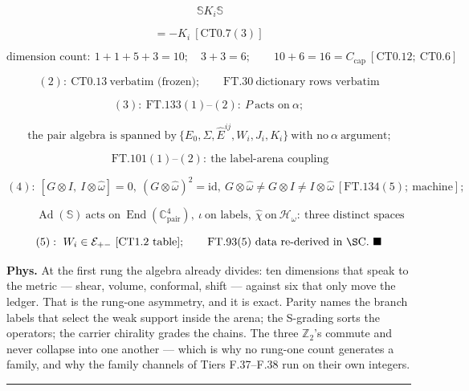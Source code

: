 \begin{theorem}
\[
\ \mathbb SK_i\mathbb S
\]

\[
= -K_i\ [\mathrm{CT0.7}(3)]
\]

\[
\text{dimension count}:\ 1+1+5+3=10;\quad3+3=6;\qquad10+6=16=C_{\mathrm{cap}}\ [\mathrm{CT0.12};\ \mathrm{CT0.6}]
\]

\[
(2):\ \mathrm{CT0.13}\ \text{verbatim (frozen)};\qquad\mathrm{FT.30}\ \text{dictionary rows verbatim}
\]

\[
(3):\ \mathrm{FT.133}(1)\text{–}(2):\ P\ \text{acts on}\ \alpha;
\]

\[
\ \text{the pair algebra is spanned by}\ \{E_0,\Sigma,\hat E^{ij},W_i,J_i,K_i\}\ \text{with no}\ \alpha\ \text{argument};
\]

\[
\qquad \mathrm{FT.101}(1)\text{–}(2):\ \text{the label-arena coupling}
\]

\[
(4):\ [G\otimes I,\ I\otimes\hat\omega]=0,\ (G\otimes\hat\omega)^2=\mathrm{id},\ G\otimes\hat\omega\ne G\otimes I\ne I\otimes\hat\omega\ [\mathrm{FT.134}(5);\ \text{machine}];
\]

\[
\qquad \operatorname{Ad}(\mathbb S)\ \text{acts on}\ \operatorname{End}(\mathbb C^4_{\mathrm{pair}}),\ \iota\ \text{on labels},\ \hat\chi\ \text{on}\ \mathcal H_\omega:\ \text{three distinct spaces}
\]

\[
(5):\ W_i\in\mathcal E_{+-}\ [\mathrm{CT1.2}\ \text{table}];\qquad\mathrm{FT.93}(5)\ \text{data re-derived in}\ \S\mathrm{C}.\ \blacksquare
\]

\textbf{Phys.} At the first rung the algebra already divides: ten dimensions that speak to the metric — shear, volume, conformal, shift — against six that only move the ledger. That is the rung-one asymmetry, and it is exact. Parity names the branch labels that select the weak support inside the arena; the S-grading sorts the operators; the carrier chirality grades the chains. The three $\mathbb{Z}$$_2$'s commute and never collapse into one another — which is why no rung-one count generates a family, and why the family channels of Tiers F.37–F.38 run on their own integers.

\vspace{2pt}\noindent\rule{\textwidth}{0.4pt}\vspace{2pt}

\end{theorem}

